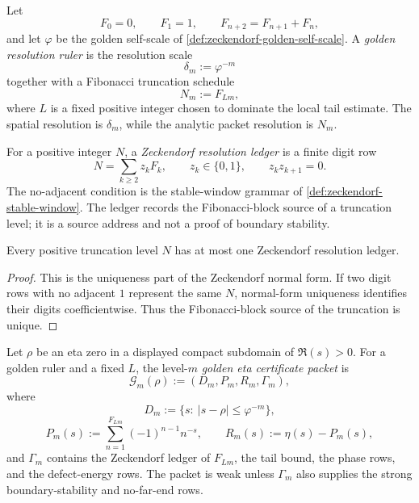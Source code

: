 \begin{definition}
\label{def:rh-golden-resolution-ruler}
Let
$$
F_0=0,\qquad F_1=1,\qquad F_{n+2}=F_{n+1}+F_n,
$$
and let $\varphi$ be the golden self-scale of
\autoref{def:zeckendorf-golden-self-scale}. A \emph{golden resolution
ruler} is the resolution scale
$$
\delta_m:=\varphi^{-m}
$$
together with a Fibonacci truncation schedule
$$
N_m:=F_{Lm},
$$
where $L$ is a fixed positive integer chosen to dominate the local tail
estimate. The spatial resolution is $\delta_m$, while the analytic
packet resolution is $N_m$.
\end{definition}

\begin{definition}
\label{def:rh-zeckendorf-resolution-ledger}
For a positive integer $N$, a \emph{Zeckendorf resolution ledger} is a
finite digit row
$$
N=\sum_{k\ge2}z_kF_k,
\qquad
z_k\in\{0,1\},
\qquad
z_kz_{k+1}=0.
$$
The no-adjacent condition is the stable-window grammar of
\autoref{def:zeckendorf-stable-window}. The ledger records the
Fibonacci-block source of a truncation level; it is a source address and
not a proof of boundary stability.
\end{definition}

\begin{theorem}
\label{thm:rh-zeckendorf-ledgers-unique-truncation-addresses}
Every positive truncation level $N$ has at most one Zeckendorf
resolution ledger.
\end{theorem}

\begin{proof}
This is the uniqueness part of the Zeckendorf normal form. If two digit
rows with no adjacent $1$ represent the same $N$, normal-form uniqueness
identifies their digits coefficientwise. Thus the Fibonacci-block source
of the truncation is unique.
\end{proof}

\begin{definition}
\label{def:rh-golden-eta-certificate-packet}
Let $\rho$ be an eta zero in a displayed compact subdomain of
$\Re(s)>0$. For a golden ruler and a fixed $L$, the level-$m$
\emph{golden eta certificate packet} is
$$
\mathcal G_m(\rho)
:=
(D_m,P_m,R_m,\Gamma_m),
$$
where
$$
D_m:=\{s:\ |s-\rho|\le\varphi^{-m}\},
$$
$$
P_m(s):=\sum_{n=1}^{F_{Lm}}(-1)^{n-1}n^{-s},
\qquad
R_m(s):=\eta(s)-P_m(s),
$$
and $\Gamma_m$ contains the Zeckendorf ledger of $F_{Lm}$, the tail
bound, the phase rows, and the defect-energy rows. The packet is weak
unless $\Gamma_m$ also supplies the strong boundary-stability and
no-far-end rows.
\end{definition}

